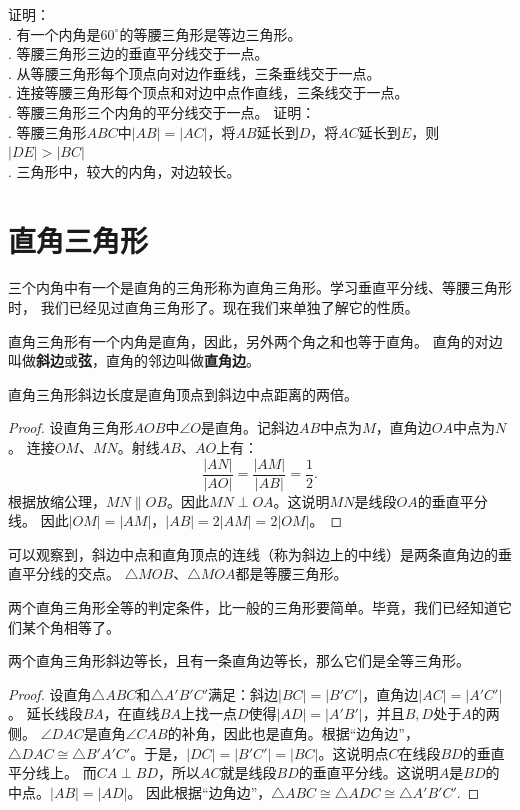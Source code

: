 \documentclass[12pt,UTF8]{ctexbook}
\begin{document}
\begin{xt}\label{xt:4-0-0}
    证明：\\
    . 有一个内角是$60^\circ$的等腰三角形是等边三角形。\\
    . 等腰三角形三边的垂直平分线交于一点。\\
    . 从等腰三角形每个顶点向对边作垂线，三条垂线交于一点。\\
    . 连接等腰三角形每个顶点和对边中点作直线，三条线交于一点。\\
    . 等腰三角形三个内角的平分线交于一点。
    证明： \\
    . 等腰三角形$ABC$中$|AB| = |AC|$，将$AB$延长到$D$，将$AC$延长到$E$，则$|DE| > |BC|$\\
    . 三角形中，较大的内角，对边较长。
\end{xt}

\section{直角三角形}
三个内角中有一个是直角的三角形称为直角三角形。学习垂直平分线、等腰三角形时，
我们已经见过直角三角形了。现在我们来单独了解它的性质。

直角三角形有一个内角是直角，因此，另外两个角之和也等于直角。
直角的对边叫做\textbf{斜边}或\textbf{弦}，直角的邻边叫做\textbf{直角边}。

\begin{tm}\label{tm:4-1-0}
    直角三角形斜边长度是直角顶点到斜边中点距离的两倍。
\end{tm}
\begin{proof}
    设直角三角形$AOB$中$\angle O$是直角。记斜边$AB$中点为$M$，直角边$OA$中点为$N$。
    连接$OM$、$MN$。射线$AB$、$AO$上有：
    $$ \frac{|AN|}{|AO|} = \frac{|AM|}{|AB|} = \frac12.$$
    根据放缩公理，$MN \parallel OB$。因此$MN \perp OA$。这说明$MN$是线段$OA$的垂直平分线。
    因此$|OM| = |AM|$，$|AB| = 2|AM| = 2|OM|$。
\end{proof}

可以观察到，斜边中点和直角顶点的连线（称为斜边上的中线）是两条直角边的垂直平分线的交点。
$\triangle MOB$、$\triangle MOA$都是等腰三角形。

两个直角三角形全等的判定条件，比一般的三角形要简单。毕竟，我们已经知道它们某个角相等了。

\begin{tm}\label{tm:4-1-1}
    两个直角三角形斜边等长，且有一条直角边等长，那么它们是全等三角形。
\end{tm}
\begin{proof}
    设直角$\triangle ABC$和$\triangle A'B'C'$满足：斜边$|BC| = |B'C'|$，直角边$|AC| = |A'C'|$。
    延长线段$BA$，在直线$BA$上找一点$D$使得$|AD| = |A'B'|$，并且$B,D$处于$A$的两侧。
    $\angle DAC$是直角$\angle CAB$的补角，因此也是直角。根据“边角边”，
    $\triangle DAC \cong \triangle B'A'C'$。于是，$|DC| = |B'C'| = |BC|$。这说明点$C$在线段$BD$的垂直平分线上。
    而$CA \perp BD$，所以$AC$就是线段$BD$的垂直平分线。这说明$A$是$BD$的中点。$|AB| = |AD|$。
    因此根据“边角边”，$\triangle ABC \cong \triangle ADC \cong \triangle A'B'C'.$
\end{proof}
\end{document}
